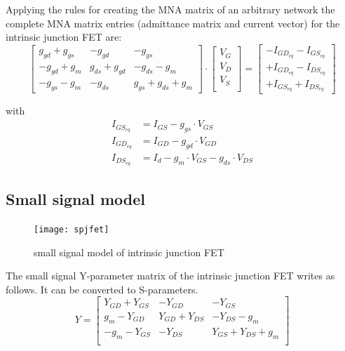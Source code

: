 \documentclass[10pt]{report}
\begin{document}
Applying the rules for creating the MNA matrix of an arbitrary network
the complete MNA matrix entries (admittance matrix and current vector)
for the intrinsic junction FET are:
\begin{equation}
\begin{bmatrix}
g_{gd} + g_{gs} & -g_{gd} & -g_{gs}\\
-g_{gd} + g_{m} & g_{ds} + g_{gd} & -g_{ds} - g_{m}\\
-g_{gs} - g_{m} & -g_{ds} & g_{gs} + g_{ds} + g_{m}
\end{bmatrix}
\cdot
\begin{bmatrix}
V_{G}\\
V_{D}\\
V_{S}\\
\end{bmatrix}
=
\begin{bmatrix}
-I_{GD_{eq}} - I_{GS_{eq}}\\
+I_{GD_{eq}} - I_{DS_{eq}}\\
+I_{GS_{eq}} + I_{DS_{eq}}
\end{bmatrix}
\end{equation}

with
\begin{align}
I_{GS_{eq}} &= I_{GS} - g_{gs}\cdot V_{GS}\\
I_{GD_{eq}} &= I_{GD} - g_{gd}\cdot V_{GD}\\
I_{DS_{eq}} &= I_{d} - g_{m}\cdot V_{GS} - g_{ds}\cdot V_{DS}
\end{align}

\subsection{Small signal model}

\begin{figure}[ht]
\begin{center}
\texttt{[image: spjfet]}
\end{center}
\caption{small signal model of intrinsic junction FET}
\label{fig:spjfet}
\end{figure}
\FloatBarrier

The small signal Y-parameter matrix of the intrinsic junction FET
writes as follows.  It can be converted to S-parameters.
\begin{equation}
Y =
\begin{bmatrix}
Y_{GD} + Y_{GS} & -Y_{GD} & -Y_{GS}\\
g_{m} - Y_{GD} & Y_{GD} + Y_{DS} & -Y_{DS} - g_{m}\\
-g_{m} - Y_{GS} & -Y_{DS} & Y_{GS} + Y_{DS} + g_{m}\\
\end{bmatrix}
\end{equation}
\end{document}
